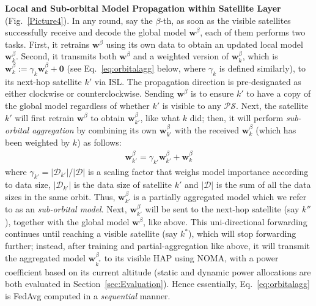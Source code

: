\documentclass[letter,journal]{IEEEtran}
\newcommand{\fref}[1]{Fig.~\ref{#1}}
\newcommand{\sref}[1]{Section~\ref{#1}}
\begin{document}
{\bf Local and Sub-orbital Model Propagation within Satellite Layer} (\fref{Picture4}).
In any round, say the $\beta$-th, as soon as the visible satellites successfully receive and decode the global model $\boldsymbol{w}^{\beta}$, each of them performs two tasks. First, it retrains $\boldsymbol{w}^{\beta}$ using its own data to obtain an updated local model $\boldsymbol{w}_{k}^{\beta}$.
Second, it transmits both $\boldsymbol{w}^{\beta}$ and a weighted version of $\boldsymbol{w}_{k}^{\beta}$, which is $\boldsymbol{w}_{k}^{\beta} := \gamma_{k} \boldsymbol{w}_{k}^{\beta}+\boldsymbol{0}$
(see Eq.~\eqref{eq:orbitalagg} below, where $\gamma_{k}$ is defined similarly), to its next-hop satellite $k'$ via ISL. The propagation direction is pre-designated as either clockwise or counterclockwise. Sending $\boldsymbol{w}^{\beta}$ is to ensure $k'$ to have a copy of the global model regardless of whether $k'$ is visible to any $\mathcal {PS}$. Next, the satellite $k'$ will first retrain $\boldsymbol{w}^{\beta}$ to obtain $\boldsymbol{w}_{k'}^{\beta}$, like what $k$ did; then, it will perform \textit{sub-orbital aggregation} by combining its own $\boldsymbol{w}_{k'}^{\beta}$ with the received $\boldsymbol{w}_{k}^{\beta}$ (which has been weighted by $k$) as follows:
\begin{align}\label{eq:orbitalagg}
    \boldsymbol{w}_{k'}^{\beta}= \gamma_{k'} \boldsymbol{w}_{k'}^{\beta}+\boldsymbol{w}_{k}^{\beta} 
\end{align}
where $\gamma_{k'} = {|\mathcal {D}_{k'}|}/{|\mathcal {D}|}$ is a scaling factor that weighs model importance according to data size, $|\mathcal {D}_{k'}|$ is the data size of satellite $k'$ and $|\mathcal {D}|$ is the sum of all the data sizes in the same orbit. Thus, $\boldsymbol{w}_{k'}^{\beta}$ is a partially aggregated model which we refer to as an {\em sub-orbital model}. Next, $\boldsymbol{w}_{k'}^{\beta}$ will be sent to the next-hop satellite (say $k''$), together with the global model $\boldsymbol{w}^{\beta}$, like above. This uni-directional forwarding continues until reaching a visible satellite (say $k^*$), which will stop forwarding further; instead, after training and partial-aggregation like above, it will transmit the aggregated model $\boldsymbol{w}_{k^*}^\beta$ to its visible HAP using NOMA, with a power coefficient based on its current altitude (static and dynamic power allocations are both evaluated in \sref{sec:Evaluation}). Hence essentially, Eq.~\eqref{eq:orbitalagg} is FedAvg computed in a {\em sequential} manner.
\end{document}
